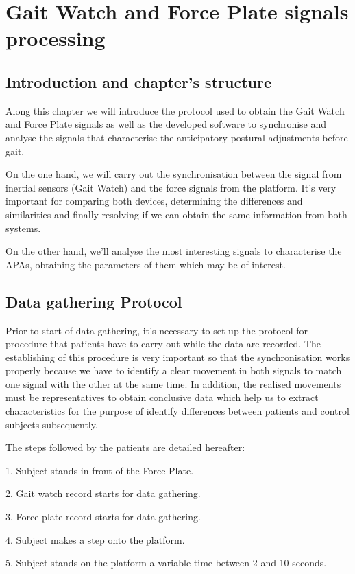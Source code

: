 \chapter{Gait Watch and Force Plate signals processing}
\label{ch:GWandFP}

\section{Introduction and chapter's structure}
Along this chapter we will introduce the protocol used to obtain the Gait Watch and Force Plate signals as well as the developed software to synchronise and analyse the signals that characterise the anticipatory postural adjustments before gait.

On the one hand, we will carry out the synchronisation between the signal from inertial sensors (Gait Watch) and the force signals from the platform. It's very important for comparing both devices, determining the differences and similarities and finally resolving if we can obtain the same information from both systems.

On the other hand, we’ll analyse the most interesting signals to characterise the APAs, obtaining the parameters of them which may be of interest.


\section{Data gathering Protocol}
Prior to start of data gathering, it’s necessary to set up the protocol for procedure that patients have to carry out while the data are recorded. The establishing of this procedure is very important so that the synchronisation works properly because we have to identify a clear movement in both signals to match one signal with the other at the same time.
In addition, the realised movements must be representatives to obtain conclusive data which help us to extract characteristics for the purpose of identify differences between patients and control subjects subsequently.

The steps followed by the patients are detailed hereafter:

1.	Subject stands in front of the Force Plate.

2.	Gait watch record starts for data gathering.

3.	Force plate record starts for data gathering.

4.	Subject makes a step onto the platform.

5.	Subject stands on the platform a variable time between 2 and 10 seconds.

